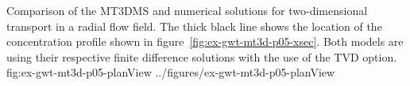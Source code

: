 \begin{StandardFigure}
	{Comparison of the MT3DMS and \mf numerical solutions for two-dimensional transport in a radial flow field.  The thick black line shows the location of the concentration profile shown in figure~\ref{fig:ex-gwt-mt3d-p05-xsec}. Both models are using their respective finite difference solutions with the use of the TVD option.} 
	{fig:ex-gwt-mt3d-p05-planView}
	{../figures/ex-gwt-mt3d-p05-planView}
\end{StandardFigure}
